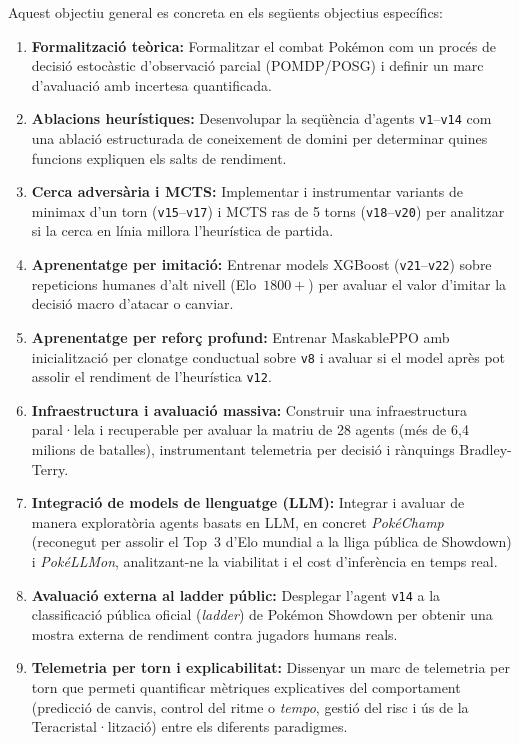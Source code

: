 Aquest objectiu general es concreta en els següents objectius específics:
\begin{enumerate}
    \item \textbf{Formalització teòrica:} Formalitzar el combat Pokémon com un procés de decisió estocàstic d'observació parcial (POMDP/POSG) i definir un marc d'avaluació amb incertesa quantificada.
    \item \textbf{Ablacions heurístiques:} Desenvolupar la seqüència d'agents \texttt{v1}--\texttt{v14} com una ablació estructurada de coneixement de domini per determinar quines funcions expliquen els salts de rendiment.
    \item \textbf{Cerca adversària i MCTS:} Implementar i instrumentar variants de minimax d'un torn (\texttt{v15}--\texttt{v17}) i MCTS ras de 5 torns (\texttt{v18}--\texttt{v20}) per analitzar si la cerca en línia millora l'heurística de partida.
    \item \textbf{Aprenentatge per imitació:} Entrenar models XGBoost (\texttt{v21}--\texttt{v22}) sobre repeticions humanes d'alt nivell (Elo~$1800+$) per avaluar el valor d'imitar la decisió macro d'atacar o canviar.
    \item \textbf{Aprenentatge per reforç profund:} Entrenar MaskablePPO amb inicialització per clonatge conductual sobre \texttt{v8} i avaluar si el model après pot assolir el rendiment de l'heurística \texttt{v12}.
    \item \textbf{Infraestructura i avaluació massiva:} Construir una infraestructura paral·lela i recuperable per avaluar la matriu de 28 agents (més de 6,4 milions de batalles), instrumentant telemetria per decisió i rànquings Bradley-Terry.
    \item \textbf{Integració de models de llenguatge (LLM):} Integrar i avaluar de manera exploratòria agents basats en LLM, en concret \textit{PokéChamp} (reconegut per assolir el Top~3 d'Elo mundial a la lliga pública de Showdown) i \textit{PokéLLMon}, analitzant-ne la viabilitat i el cost d'inferència en temps real.
    \item \textbf{Avaluació externa al ladder públic:} Desplegar l'agent \texttt{v14} a la classificació pública oficial (\emph{ladder}) de Pokémon Showdown per obtenir una mostra externa de rendiment contra jugadors humans reals.
    \item \textbf{Telemetria per torn i explicabilitat:} Dissenyar un marc de telemetria per torn que permeti quantificar mètriques explicatives del comportament (predicció de canvis, control del ritme o \emph{tempo}, gestió del risc i ús de la Teracristal·lització) entre els diferents paradigmes.
\end{enumerate}

